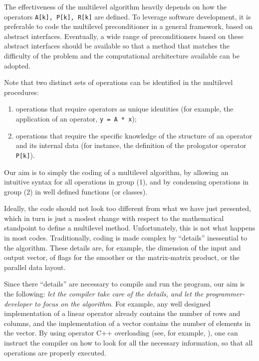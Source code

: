 \documentclass{article}[11pt]
\begin{document}
The effectiveness of the multilevel algorithm heavily depends on 
how the operators \verb!A[k], P[k], R[k]! are defined. To leverage software
development, it is preferable to code the multilevel preconditioner in a
general framework, based on abstract interfaces. Eventually, a  wide range
of preconditioners based on these abstract interfaces should be available so
that a method that matches the difficulty of the problem and the computational
architecture available can be adopted.

\smallskip

Note that two distinct sets of operations can be identified in the multilevel
procedures:
\begin{enumerate}
\item operations that require operators as unique identities (for example,
  the application of an operator, \verb!y = A * x!);
\item operations that require the specific knowledge of the structure
  of an operator and its internal data (for instance, the definition of the
  prologator operator \verb!P[k]!).
\end{enumerate}

Our aim is to simply the coding of a multilevel algorithm, by allowing
an intuitive syntax for all operations in group (1), and by condensing
operations in group (2) in well defined functions (or classes). 

Ideally, the code should not look too different from what we have just
presented, which in turn is just a modest change with respect to the
mathematical standpoint to define a multilevel method. Unfortunately, this is
not what happens in most codes.  Traditionally, coding is made complex by
``details'' inessential to the algorithm.  These details are, for example, the
dimension of the input and output vector, of flags for the smoother or the
matrix-matrix product, or the parallel data layout.

Since there ``details'' are necessary to compile and run the program, 
  our aim is the following: {\em let the
compiler take care of the details, and let the programmer-developer to
focus on the algorithm}. For example, any well designed implementation of a linear
operator already contains the number of rows and columns, and the
implementation of a vector contains the number of elements in the vector.
By using operator C++ overloading (see, for example, \cite{stroustrup91cpp}), 
  one can instruct the compiler on how to
look for all the necessary information, so that all operations are properly
executed.
\end{document}
